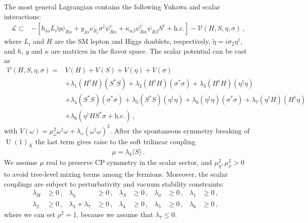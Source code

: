 \documentclass[12pt]{article}
\begin{document}
The most general Lagrangian contains the following Yukawa and scalar interactions:
%
\begin{align*}
\label{Eq:LagY}
    \mathcal{L} \subset& -[ 
    h_{i\alpha} \overline{L_{i}} \tilde{\eta} \psi_{R\alpha} +  y_{j\alpha} \overline{\nu_{R_{j}}} \sigma^{\dagger} \psi^c_{R\alpha} + \kappa_{\alpha\beta} \overline{\psi^{c}_{R\alpha}} \psi_{R\beta} S^\dagger + \text{h.c.}] - \mathcal{V}(H, S, \eta, \sigma)\,,
\end{align*}
%
where $L_{i}$ and $H$ are the SM lepton and Higgs doublets, respectively,  $\widetilde{\eta} = i \sigma_2 \eta^{\dagger}$, and $h$, $y$ and $\kappa$ are matrices in the flavor space. 
The scalar potential can be cast as
%
\begin{align*}
    \mathcal{V}(H, S, \eta, \sigma) = & V(H) + V(S) + V(\eta) + V(\sigma) \\
    &+  \lambda_{1} (H^{\dagger} H ) (S^{*} S) + \lambda_{2} (H^{\dagger} H ) (\sigma^{*} \sigma ) + \lambda_{3} (H^{\dagger} H ) (\eta^{\dagger} \eta )\\
    &+ \lambda_{4} (S^{*} S) (\sigma^{*} \sigma ) + \lambda_{5} (S^{*} S) (\eta^{\dagger} \eta ) + \lambda_{6} (\eta^{\dagger} \eta ) (\sigma^{*} \sigma ) + \lambda_{7} (\eta^{\dagger} H ) (H^{\dagger} \eta ) \\
    &+ \lambda_{8} (\eta^{\dagger} H S^{*} \sigma + \text{h.c.})\,,
\end{align*}
%
with $V(\omega) = \mu^{2}_{\omega} \omega^{\dagger} \omega + \lambda_{\omega} (\omega^{\dagger} \omega)^{2}$. After the spontaneous symmetry breaking of $\operatorname{U}(1)_X$ the last term gives raise to the soft trilinear coupling
\begin{align}
  \mu=\lambda_8 \langle S \rangle\,.
\end{align}
We assume $\mu$ real to preserve CP symmetry in the scalar sector, and $\mu^2_\eta,\mu^2_\sigma>0$ to avoid tree-level mixing terms among the fermions. Moreover, the scalar couplings are subject to perturbativity and vacuum stability constraints:
\begin{align*}
\lambda_{H} &\geq 0\,, & \lambda_{\eta} &\geq 0\,, & \lambda_{S} &\geq 0\,, & \lambda_{\sigma} &\geq 0\,, & \lambda_{1} &\geq 0\,, & \\
\lambda_{2} &\geq 0\,, &
\lambda_{3}+\lambda_{7} &\geq 0\,, & \lambda_{4} &\geq 0\,, & \lambda_{5} &\geq 0\,, & \lambda_{6} &\geq 0\,,
\end{align*}
where we can set $\rho^{2} = 1$, because we assume that $\lambda_{7} \leq 0$.
\end{document}
